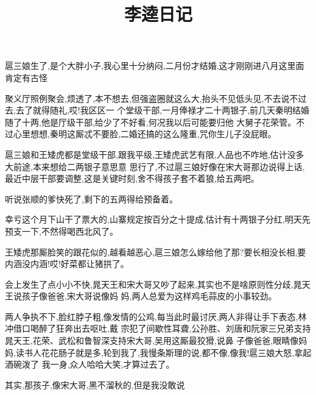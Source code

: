 ﻿\documentclass[12pt]{article}
\title{李逵日记}
\author{}
\date{}
\begin{document}
\twocolumn[
\begin{@twocolumnfalse}
\maketitle\thispagestyle{empty}
\end{@twocolumnfalse}
]

\clearpage


\section{}

扈三娘生了,是个大胖小子,我心里十分纳闷,二月份才结婚,这才刚刚进八月\dldots 这里面肯定有古怪\dldots

聚义厅照例聚会,烦透了,本不想去,但强盗圈就这么大,抬头不见低头见,不去说不过去,去了就得随礼,哎!我区区一
个堂级干部,一月俸禄才二十两银子,前几天秦明结婚随了十两,他是厅级干部,给少了不好看,何况我以后可能要归他
大舅子花荣管。不过心里想想,秦明这厮忒不要脸,二婚还搞的这么隆重,咒你生儿子没屁眼。

扈三娘和王矮虎都是堂级干部,跟我平级,王矮虎武艺有限,人品也不咋地,估计没多大前途,本来想给二两银子意思意
思行了,不过扈三娘好像在宋大哥那边说得上话,最近中层干部要调整,这是关键时刻,舍不得孩子套不着狼,给五两吧。

听说张顺的爹快死了,剩下的五两得给预备着。

幸亏这个月下山干了票大的,山寨规定按百分之十提成,估计有十两银子分红,明天先预支一下,不然得喝西北风了。

王矮虎那厮脸笑的跟花似的,越看越恶心,扈三娘怎么嫁给他了那?要长相没长相,要内涵没内涵!哎!好菜都让猪拱了。

会上发生了点小小不快,晁天王和宋大哥又吵了起来,其实也不是啥原则性分歧,晁天王说孩子像爸爸,宋大哥说像妈
妈,两人总爱为这样鸡毛蒜皮的小事较劲。

两人争执不下,脸红脖子粗,像发情的公鸡,每当此时最讨厌,两人非得让手下表态,林冲借口喝醉了狂奔出去呕吐,戴
宗犯了间歇性耳聋,公孙胜、刘唐和阮家三兄弟支持晁天王,花荣、武松和鲁智深支持宋大哥,吴用这厮最狡猾,说鼻
子像爸爸,眼睛像妈妈,读书人花花肠子就是多,轮到我了,我慢条斯理的说,都不像,像我!扈三娘大怒,拿起酒碗泼了
我一身,众人哈哈大笑,才算过去了。

其实,那孩子,像宋大哥,黑不溜秋的,但是我没敢说

\section{}
\end{document}
